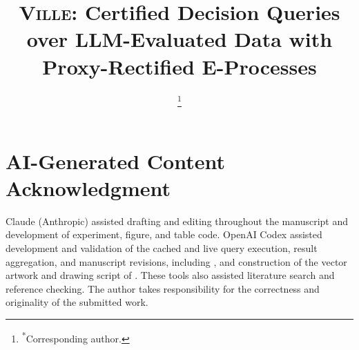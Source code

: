 \documentclass[conference]{IEEEtran}
\theoremstyle{definition}
\newcommand{\sys}{\textup{\textsc{Ville}}}
\begin{document}
\title{\sys: Certified Decision Queries over LLM-Evaluated Data with Proxy-Rectified E-Processes}

\author{
\thanks{\textsuperscript{*}Corresponding author.}}

\maketitle










\section*{AI-Generated Content Acknowledgment}
Claude (Anthropic) assisted drafting and editing throughout the manuscript and development of experiment, figure, and table code. OpenAI Codex assisted development and validation of the cached and live query execution, result aggregation, and manuscript revisions, including , and construction of the vector artwork and drawing script of . These tools also assisted literature search and reference checking. The author takes responsibility for the correctness and originality of the submitted work.



\end{document}
